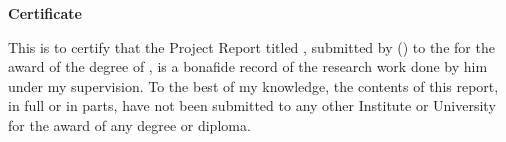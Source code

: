 \begin{flushright}
  \huge{\textbf{Certificate}}
\end{flushright}

\vspace{0.5cm}

This is to certify that the Project Report titled \ttitle{}, submitted by \authorname{} (\rn{}) to the \univname{} for the award of the degree of \degree{}, is a bonafide record of the research work done by him under my supervision. To the best of my knowledge, the contents of this report, in full or in parts, have not been submitted to any other Institute or University for the award of any degree or diploma.

\vspace{2cm}

\begin{flushright}
  \supname{}\\
  \suppost{}\\
  \supdeptname{}
\end{flushright}
